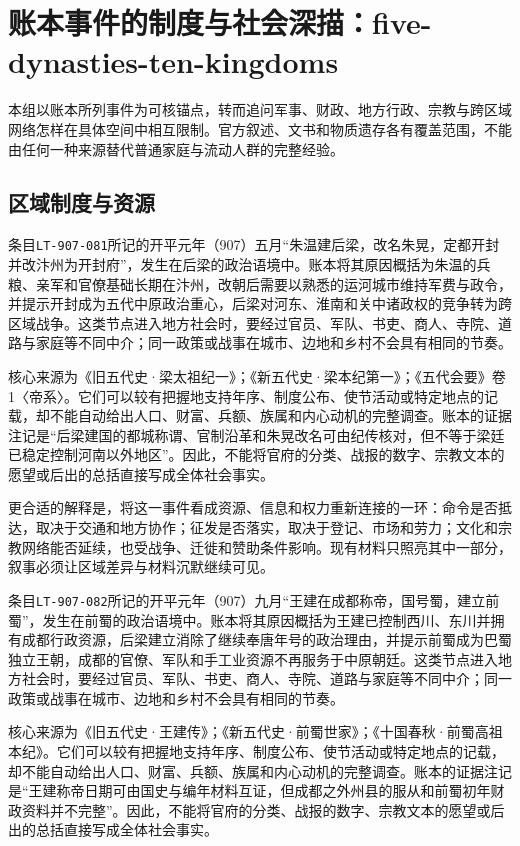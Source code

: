 \section{账本事件的制度与社会深描：five-dynasties-ten-kingdoms}

\label{sec:ledger-depth-five-dynasties-ten-kingdoms}

本组以账本所列事件为可核锚点，转而追问军事、财政、地方行政、宗教与跨区域网络怎样在具体空间中相互限制。官方叙述、文书和物质遗存各有覆盖范围，不能由任何一种来源替代普通家庭与流动人群的完整经验。

\subsection{区域制度与资源}

条目\texttt{LT-907-081}所记的开平元年（907）五月“朱温建后梁，改名朱晃，定都开封并改汴州为开封府”，发生在后梁的政治语境中。账本将其原因概括为朱温的兵粮、亲军和官僚基础长期在汴州，改朝后需要以熟悉的运河城市维持军费与政令，并提示开封成为五代中原政治重心，后梁对河东、淮南和关中诸政权的竞争转为跨区域战争。这类节点进入地方社会时，要经过官员、军队、书吏、商人、寺院、道路与家庭等不同中介；同一政策或战事在城市、边地和乡村不会具有相同的节奏。

核心来源为《旧五代史·梁太祖纪一》；《新五代史·梁本纪第一》；《五代会要》卷1〈帝系〉。它们可以较有把握地支持年序、制度公布、使节活动或特定地点的记载，却不能自动给出人口、财富、兵额、族属和内心动机的完整调查。账本的证据注记是“后梁建国的都城称谓、官制沿革和朱晃改名可由纪传核对，但不等于梁廷已稳定控制河南以外地区”。因此，不能将官府的分类、战报的数字、宗教文本的愿望或后出的总括直接写成全体社会事实。

更合适的解释是，将这一事件看成资源、信息和权力重新连接的一环：命令是否抵达，取决于交通和地方协作；征发是否落实，取决于登记、市场和劳力；文化和宗教网络能否延续，也受战争、迁徙和赞助条件影响。现有材料只照亮其中一部分，叙事必须让区域差异与材料沉默继续可见。

条目\texttt{LT-907-082}所记的开平元年（907）九月“王建在成都称帝，国号蜀，建立前蜀”，发生在前蜀的政治语境中。账本将其原因概括为王建已控制西川、东川并拥有成都行政资源，后梁建立消除了继续奉唐年号的政治理由，并提示前蜀成为巴蜀独立王朝，成都的官僚、军队和手工业资源不再服务于中原朝廷。这类节点进入地方社会时，要经过官员、军队、书吏、商人、寺院、道路与家庭等不同中介；同一政策或战事在城市、边地和乡村不会具有相同的节奏。

核心来源为《旧五代史·王建传》；《新五代史·前蜀世家》；《十国春秋·前蜀高祖本纪》。它们可以较有把握地支持年序、制度公布、使节活动或特定地点的记载，却不能自动给出人口、财富、兵额、族属和内心动机的完整调查。账本的证据注记是“王建称帝日期可由国史与编年材料互证，但成都之外州县的服从和前蜀初年财政资料并不完整”。因此，不能将官府的分类、战报的数字、宗教文本的愿望或后出的总括直接写成全体社会事实。

